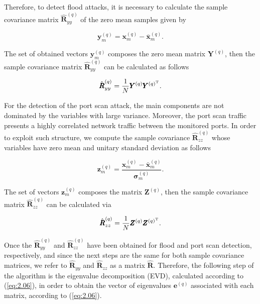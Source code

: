 Therefore, to detect flood attacks, it is necessary to calculate the sample covariance matrix $\hat{\pmb{R}}_{yy}^{(q)}$ of the zero mean samples given by

\begin{equation}
\label{eq:2.02}
\pmb{y}_{m}^{(q)} = \pmb{x}_{m}^{(q)} - \bar{\pmb{x}}_{m}^{(q)}.
\end{equation}

The set of obtained vectors $\pmb{y}_{m}^{(q)}$ composes the zero mean matrix $\pmb{Y}^{(q)}$, then the sample covariance matrix $\hat{\pmb{R}}_{yy}^{(q)}$ can be calculated as follows

\begin{equation}\label{eq:2.03}
\hat{\pmb{R}}_{yy}^{(q)} = \frac{1}{N}\pmb{Y}^{(q)}\pmb{Y}^{(q)^{\rm T}}.
\end{equation}

For the detection of the port scan attack, the main components are not dominated by the variables with large variance. Moreover, the port scan traffic presents a highly correlated network traffic between the monitored ports. In order to exploit such structure, we compute the sample covariance $\hat{\pmb{R}}_{zz}^{(q)}$ whose variables have zero mean and unitary standard deviation as follows

\begin{equation}
\label{eq:2.04}
\pmb{z}_{m}^{(q)} = \frac{\pmb{x}_{m}^{(q)} - \bar{\pmb{x}}_{m}^{(q)}}{\pmb{\sigma}_{m}^{(q)}}.
\end{equation}

The set of vectors $\pmb{z}_{m}^{(q)}$ composes the matrix $\pmb{Z}^{(q)}$, then the sample covariance matrix $\hat{\pmb{R}}_{zz}^{(q)}$ can be calculated via 

\begin{equation}\label{eq:2.05}
\hat{\pmb{R}}_{zz}^{(q)} = \frac{1}{N}\pmb{Z}^{(q)}\pmb{Z}^{(q)^{\rm T}}.
\end{equation}

Once the $\hat{\pmb{R}}_{yy}^{(q)}$ and $\hat{\pmb{R}}_{zz}^{(q)}$ have been obtained for flood and port scan detection, respectively, and since the next steps are the same for both sample covariance matrices, we refer to $\hat{\pmb{R}}_{yy}$ and $\hat{\pmb{R}}_{zz}$ as a matrix $\hat{\pmb{R}}$. Therefore, the following step of the algorithm is the eigenvalue decomposition (EVD), calculated according to (\ref{eq:2.06}), in order to obtain the vector of eigenvalues $\pmb{e}^{(q)}$ associated with each matrix, according to (\ref{eq:2.06}).

